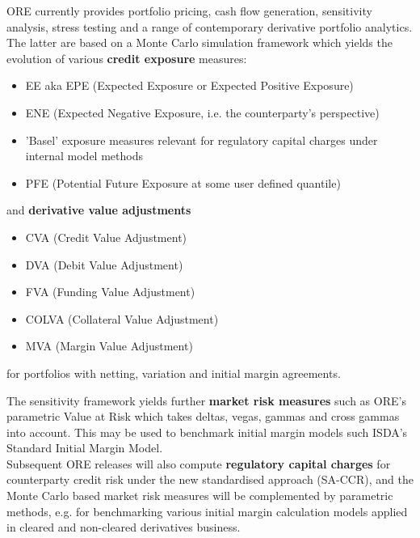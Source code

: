 \documentclass[12pt, a4paper]{article}
\begin{document}
ORE currently provides portfolio pricing, cash flow generation, sensitivity analysis, stress testing and a range of contemporary derivative portfolio analytics. The latter are based on a Monte Carlo simulation framework which yields 
the evolution of various {\bf credit exposure} measures:
\begin{itemize}
\item EE aka EPE (Expected Exposure or Expected Positive Exposure)
\item ENE (Expected Negative Exposure, i.e. the counterparty's perspective)
\item 'Basel' exposure measures relevant for regulatory capital charges under internal model methods 
\item PFE (Potential Future Exposure at some user defined quantile)
\end{itemize}
and {\bf derivative value adjustments}
\begin{itemize}
\item CVA (Credit Value Adjustment)
\item DVA (Debit Value Adjustment)
\item FVA (Funding Value Adjustment)
\item COLVA (Collateral Value Adjustment)
\item MVA (Margin Value Adjustment)
\end{itemize}
for portfolios with netting, variation and initial margin agreements. 

\medskip
The sensitivity framework yields further {\bf market risk measures} such as ORE's parametric Value at Risk which takes deltas, vegas, gammas and cross gammas into account. This may be used to benchmark initial margin models such ISDA's Standard Initial Margin Model. \\

\medskip
Subsequent ORE releases will also compute {\bf regulatory capital charges} for counterparty credit risk under the new standardised approach (SA-CCR), and the Monte Carlo based market risk measures will be complemented by parametric methods, e.g. for benchmarking various initial margin calculation models applied in cleared and non-cleared derivatives business.
\end{document}
